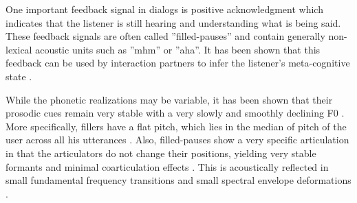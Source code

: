 \documentclass[letterpaper]{article}
\begin{document}
%

%
%

One important feedback signal in dialogs is positive acknowledgment which indicates that the listener is still hearing and understanding what is being said. These feedback signals are often called ''filled-pauses'' and contain generally non-lexical acoustic units such as ''mhm'' or ''aha''. It has been shown that this feedback can be used by interaction partners to infer the listener's meta-cognitive state \cite{Brennan1995}.

While the phonetic realizations may be variable, it has been shown that their prosodic cues remain very stable with a very slowly and smoothly declining F0 \cite{Tsiaras}.
More specifically, fillers have a flat pitch, which lies in the median of pitch of the user across all his utterances \cite{Garg2006}.
Also, filled-pauses show a very specific articulation in that the articulators do not change their positions, yielding very stable formants and minimal coarticulation effects \cite{Audhkhasi2009}.
This is acoustically reflected in small fundamental frequency transitions and small spectral envelope deformations %
\cite{Goto1999}.
\end{document}

